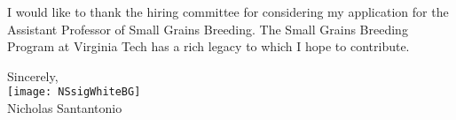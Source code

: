 \documentclass[11pt, letterpaper]{moderncv}
\begin{document}
I would like to thank the hiring committee for considering my application for the Assistant Professor of Small Grains Breeding. The Small Grains Breeding Program at Virginia Tech has a rich legacy to which I hope to contribute. 

\vspace{3mm}

Sincerely,\\
\texttt{[image: NSsigWhiteBG]}\\
Nicholas Santantonio
\end{document}
